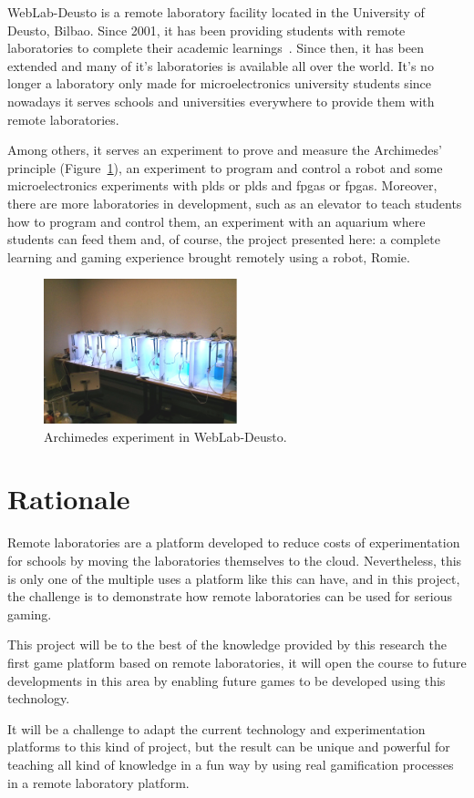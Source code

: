WebLab-Deusto is a remote laboratory facility located in the University of Deusto, Bilbao. Since
2001, it has been providing students with remote laboratories to complete their academic
learnings~\cite{weblab}. Since then, it has been extended and many of it's laboratories is available
all over the world. It's no longer a laboratory only made for microelectronics university students
since nowadays it serves schools and universities everywhere to provide them with remote
laboratories.

Among others, it serves an experiment to prove and measure the Archimedes' principle
(Figure~\ref{fig:archimedes}), an experiment to program and control a robot and some
microelectronics experiments with \acrlong{pld}s or \acrshort{pld}s and \acrlong{fpga}s or
\acrshort{fpga}s. Moreover, there are more laboratories in development, such as an elevator to teach
students how to program and control them, an experiment with an aquarium where students can feed
them and, of course, the project presented here: a complete learning and gaming experience brought
remotely using a robot, Romie.

\begin{figure}[!htbp]
	\centering
	\includegraphics[width=0.5\textwidth]{fig/archimedes.jpg}
	\caption{Archimedes experiment in WebLab-Deusto.}\label{fig:archimedes}
\end{figure}

\section{Rationale}

Remote laboratories are a platform developed to reduce costs of experimentation for schools by
moving the laboratories themselves to the cloud. Nevertheless, this is only one of the multiple uses
a platform like this can have, and in this project, the challenge is to demonstrate how remote
laboratories can be used for serious gaming.

This project will be to the best of the knowledge provided by this research the first game platform
based on remote laboratories, it will open the course to future developments in this area by
enabling future games to be developed using this technology.

It will be a challenge to adapt the current technology and experimentation platforms to this kind of
project, but the result can be unique and powerful for teaching all kind of knowledge in a fun way
by using real gamification processes in a remote laboratory platform.

